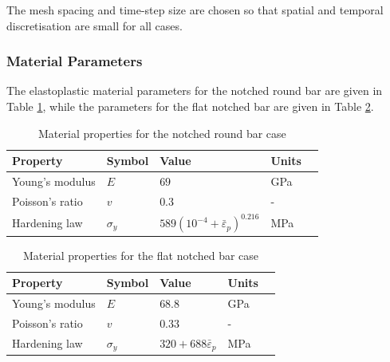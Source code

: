 \documentclass[sn-mathphys,Numbered,draft]{sn-jnl}%
\begin{document}
The mesh spacing and time-step size are chosen so that spatial and temporal discretisation are small for all cases.




%

\subsubsection{Material Parameters}

The elastoplastic material parameters for the notched round bar are given in Table \ref{tab:notched_bar_mat}, while the parameters for the flat notched bar are given in Table \ref{tab:flat_bar_mat}.
\begin{table}[htb]
	\centering
		\begin{tabular}{lllll} \hline
			Property & Symbol & Value  & Units \\ \hline 
			Young's modulus & $E$ & $69$ & GPa \\
			Poisson's ratio & $v$ & $0.3$  & - \\
			Hardening law & $\sigma_y$ & $589({10^{-4}+\bar{\varepsilon}}_p)^{0.216}$ & MPa  \\
			\hline
		\end{tabular}
	\caption{Material properties for the notched round bar case}
	\label{tab:notched_bar_mat}
\end{table}
\begin{table}[htb]
	\centering
		\begin{tabular}{lllll} \hline
			Property & Symbol & Value & Units  \\ \hline 
			Young's modulus & $E$ & $68.8$ & GPa \\
			Poisson's ratio & $v$ & $0.33$   & -\\
			Hardening law & $\sigma_y$ & $320+688\bar{\varepsilon}_p$ & MPa  \\
			\hline
		\end{tabular}
	\caption{Material properties for the flat notched bar case}
	\label{tab:flat_bar_mat}
\end{table}
\end{document}
